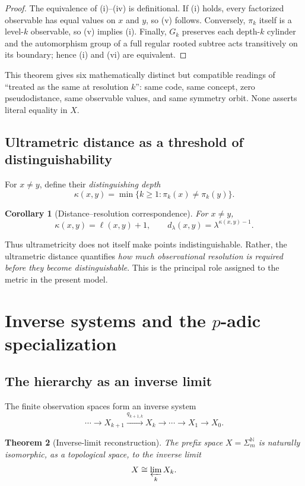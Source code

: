 \documentclass[11pt]{article}
\newtheorem{theorem}{Theorem}[section]
\newtheorem{corollary}[theorem]{Corollary}
\theoremstyle{definition}
\theoremstyle{remark}
\newcommand{\N}{\mathbb N}
\begin{document}
\begin{proof}
The equivalence of (i)--(iv) is definitional.  If (i) holds, every factorized observable has equal values on $x$ and $y$, so (v) follows.  Conversely, $\pi_k$ itself is a level-$k$ observable, so (v) implies (i).  Finally, $G_k$ preserves each depth-$k$ cylinder and the automorphism group of a full regular rooted subtree acts transitively on its boundary; hence (i) and (vi) are equivalent.
\end{proof}

This theorem gives six mathematically distinct but compatible readings of ``treated as the same at resolution $k$'': same code, same concept, zero pseudodistance, same observable values, and same symmetry orbit.  None asserts literal equality in $X$.

\subsection{Ultrametric distance as a threshold of distinguishability}

For $x\ne y$, define their \emph{distinguishing depth}
\[
\kappa(x,y)=\min\{k\ge 1:\pi_k(x)\ne\pi_k(y)\}.
\]

\begin{corollary}[Distance--resolution correspondence]\label{cor:distres}
For $x\ne y$,
\[
\kappa(x,y)=\ell(x,y)+1,
\qquad
 d_\lambda(x,y)=\lambda^{\kappa(x,y)-1}.
\]
\end{corollary}

Thus ultrametricity does not itself make points indistinguishable.  Rather, the ultrametric distance quantifies \emph{how much observational resolution is required before they become distinguishable}.  This is the principal role assigned to the metric in the present model.

\section{Inverse systems and the $p$-adic specialization}

\subsection{The hierarchy as an inverse limit}

The finite observation spaces form an inverse system
\[
\cdots \to X_{k+1}\xrightarrow{q_{k+1,k}}X_k\to\cdots\to X_1\to X_0.
\]

\begin{theorem}[Inverse-limit reconstruction]\label{thm:inverse}
The prefix space $X=\Sigma_m^{\N}$ is naturally isomorphic, as a topological space, to the inverse limit
\[
X\cong\varprojlim_k X_k.
\]
\end{theorem}
\end{document}
